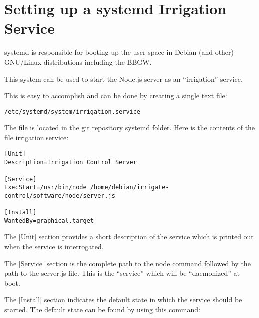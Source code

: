 %
%
%

\chapter{Setting up a systemd Irrigation Service}

systemd is responsible for booting up the user space in Debian (and other) 
GNU/Linux distributions including the BBGW.

This system can be used to start the Node.js server as an ``irrigation'' 
service.

This is easy to accomplish and can be done by creating a single text file:

\begin{verbatim}
/etc/systemd/system/irrigation.service
\end{verbatim}

The file is located in the git repository systemd folder.
Here is the contents of the file irrigation.service:

\begin{verbatim}
[Unit]
Description=Irrigation Control Server

[Service]
ExecStart=/usr/bin/node /home/debian/irrigate-control/software/node/server.js

[Install]
WantedBy=graphical.target
\end{verbatim}

The [Unit] section provides a short description of the service which is printed 
out when the service is interrogated.

The [Service] section is the complete path to the node command followed by the 
path to the server.js file.  This is the ``service'' which will be 
``daemonized'' at boot.

The [Install] section indicates the default state in which the service should 
be started.  The default state can be found by using this command:

